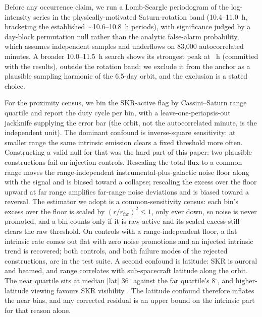 \documentclass[twocolumn]{aastex631}
\begin{document}
Before any occurrence claim, we run a Lomb-Scargle periodogram of the log-intensity series in
the physically-motivated Saturn-rotation band (10.4--11.0~h, bracketing the established
$\sim$10.6--10.8~h periods), with significance judged by a day-block permutation null rather
than the analytic false-alarm probability, which assumes independent samples and underflows on
83,000 autocorrelated minutes. A broader 10.0--11.5~h search shows its strongest peak at
\skrRealBroadPeak~h (committed with the results), outside the rotation band; we exclude it from
the anchor as a plausible sampling harmonic of the 6.5-day orbit, and the exclusion is a stated
choice.

For the proximity census, we bin the SKR-active flag by Cassini--Saturn range quartile and
report the duty cycle per bin, with a leave-one-periapsis-out jackknife supplying the error bar
(the orbit, not the autocorrelated minute, is the independent unit). The dominant confound is
inverse-square sensitivity: at smaller range the same intrinsic emission clears a fixed threshold
more often. Constructing a valid null for that was the hard part of this paper: two plausible constructions
fail on injection controls. Rescaling the total flux to a common
range moves the range-independent instrumental-plus-galactic noise floor along with the signal
and is biased toward a collapse; rescaling the excess over the floor upward at far range
amplifies far-range noise deviations and is biased toward a reversal. The estimator we adopt is a
common-sensitivity census: each bin's excess over the floor is scaled by $(r/r_\mathrm{far})^2
\le 1$, only ever down, so noise is never promoted, and a bin counts only if it is
raw-active and its scaled excess still clears the raw threshold. On controls with a
range-independent floor, a flat intrinsic rate comes out flat with zero noise promotions and an
injected intrinsic trend is recovered; both controls, and both failure modes of the rejected
constructions, are in the test suite. A second confound is latitude: SKR is auroral and beamed,
and range correlates with sub-spacecraft latitude along the orbit. The near quartile sits at
median $|$lat$|$ 36$^\circ$ against the far quartile's 8$^\circ$, and higher-latitude viewing
favours SKR visibility \citep{lamy2008}. The latitude confound therefore inflates the near bins,
and any corrected residual is an upper bound on the intrinsic part for that reason alone.
\end{document}
